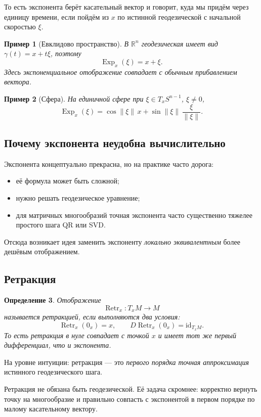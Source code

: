 \documentclass[12pt,a4paper]{article}
\theoremstyle{rudef}
\newtheorem{definition}{Определение}[section]
\newtheorem{example}[definition]{Пример}
\theoremstyle{ruplain}
\newcommand{\R}{\mathbb{R}}
\newcommand{\Exp}{\operatorname{Exp}}
\newcommand{\Retr}{\operatorname{Retr}}
\newcommand{\norm}[1]{\left\lVert #1\right\rVert}
\begin{document}
То есть экспонента берёт касательный вектор и говорит, куда мы придём через единицу времени, если пойдём из $x$ по истинной геодезической с начальной скоростью $\xi$.

\begin{example}[Евклидово пространство]
В $\R^n$ геодезическая имеет вид $\gamma(t)=x+t\xi$, поэтому
\[
\Exp_x(\xi)=x+\xi.
\]
Здесь экспоненциальное отображение совпадает с обычным прибавлением вектора.
\end{example}

\begin{example}[Сфера]
На единичной сфере при $\xi\in T_xS^{n-1}$, $\xi\neq 0$,
\[
\Exp_x(\xi)= \cos\norm{\xi}\,x + \sin\norm{\xi}\,\frac{\xi}{\norm{\xi}}.
\]
\end{example}

\subsection{Почему экспонента неудобна вычислительно}

Экспонента концептуально прекрасна, но на практике часто дорога:
\begin{itemize}
  \item её формула может быть сложной;
  \item нужно решать геодезическое уравнение;
  \item для матричных многообразий точная экспонента часто существенно тяжелее простого шага QR или SVD.
\end{itemize}

Отсюда возникает идея заменить экспоненту \emph{локально эквивалентным} более дешёвым отображением.

\subsection{Ретракция}

\begin{definition}
Отображение
\[
\Retr_x:T_xM\to M
\]
называется \emph{ретракцией}, если выполняются два условия:
\[
\Retr_x(0_x)=x,
\qquad
D\Retr_x(0_x)=\mathrm{id}_{T_xM}.
\]
То есть ретракция в нуле совпадает с точкой $x$ и имеет тот же первый дифференциал, что и экспонента.
\end{definition}

На уровне интуиции: ретракция --- это \emph{первого порядка точная аппроксимация} истинного геодезического шага.

\begin{warningbox}
Ретракция не обязана быть геодезической. Её задача скромнее: корректно вернуть точку на многообразие и правильно совпасть с экспонентой в первом порядке по малому касательному вектору.
\end{warningbox}
\end{document}
